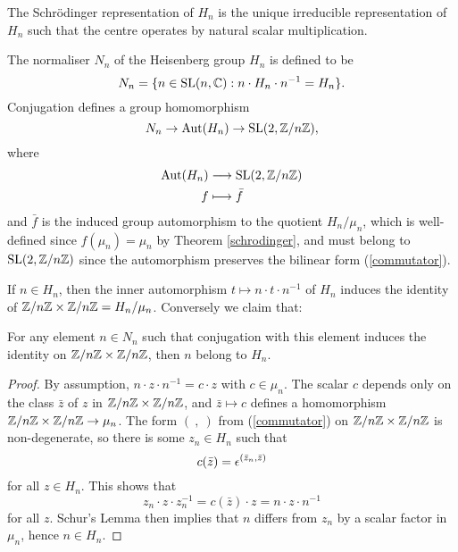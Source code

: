 \begin{theorem}
	\label{schrodinger}
	The Schr{\"o}dinger representation of $H_{n}$ is the unique irreducible representation of $H_{n}$ such that the centre operates by natural scalar multiplication.
\end{theorem}

The normaliser $N_{n}$ of the Heisenberg group $H_{n}$ is defined to be
\begin{equation*}
	N_{n} = \{ n \in \operatorname{SL}(n,\mathbb{C}) : n\cdot H_{n} \cdot n^{-1} = H_{n}\}.
\end{equation*}
Conjugation defines a group homomorphism
\begin{equation*}
	N_{n} \rightarrow \operatorname{Aut}(H_{n}) \rightarrow \operatorname{SL}(2,\mathbb{Z}/n\mathbb{Z}),
\end{equation*}
where
\begin{equation*}
\begin{split}
\operatorname{Aut}(H_{n}) &\longrightarrow \operatorname{SL}(2,\mathbb{Z}/n\mathbb{Z})\\
f &\longmapsto \bar{f}			
\end{split}
\end{equation*}
and $\bar{f}$ is the induced group automorphism to the quotient $H_{n}/\mu_{n}$, which is well-defined since $f(\mu_{n}) = \mu_{n}$ by Theorem \ref{schrodinger}, and must belong to $\operatorname{SL}(2,\mathbb{Z}/n\mathbb{Z})$ since the automorphism preserves the bilinear form (\ref{commutator}).

If $n \in H_{n}$, then the inner automorphism $t \mapsto n\cdot t \cdot n^{-1}$ of $H_{n}$ induces the identity of $\mathbb{Z}/n\mathbb{Z} \times \mathbb{Z}/n\mathbb{Z} = H_{n}/\mu_{n}$. Conversely we claim that:\\
\begin{claim}
	For any element $n \in N_{n}$ such that conjugation with this element induces the identity on $\mathbb{Z}/n\mathbb{Z}\times \mathbb{Z}/n\mathbb{Z}$, then $n$ belong to $H_{n}$.
\end{claim}

\begin{proof}
	 By assumption, $n \cdot z \cdot n^{-1} = c\cdot z$ with $c \in \mu_{n}$. The scalar $c$ depends only on the class $\bar{z}$ of $z$ in $\mathbb{Z}/n\mathbb{Z} \times \mathbb{Z}/n\mathbb{Z}$, and $\bar{z} \mapsto c$ defines a homomorphism $\mathbb{Z}/n\mathbb{Z} \times \mathbb{Z}/n\mathbb{Z} \rightarrow \mu_{n}$. The form $(\ ,\ )$ from (\ref{commutator}) on $\mathbb{Z}/n\mathbb{Z} \times \mathbb{Z}/n\mathbb{Z}$ is non-degenerate, so there is some $z_{n} \in H_{n}$ such that
	 \begin{equation*}
	 	c(\bar{z}) = \epsilon^{(\bar{z}_{n}, \bar{z})}
	 \end{equation*}
	 for all $z \in H_{n}$. This shows that
	 \begin{equation*}
	 	z_{n} \cdot z \cdot z_{n}^{-1} = c(\bar{z}) \cdot z = n\cdot z \cdot n^{-1}
	 \end{equation*}
	 for all $z$. Schur's Lemma then implies that $n$ differs from $z_{n}$ by a scalar factor in $\mu_{n}$, hence $n \in H_{n}$.
\end{proof}

